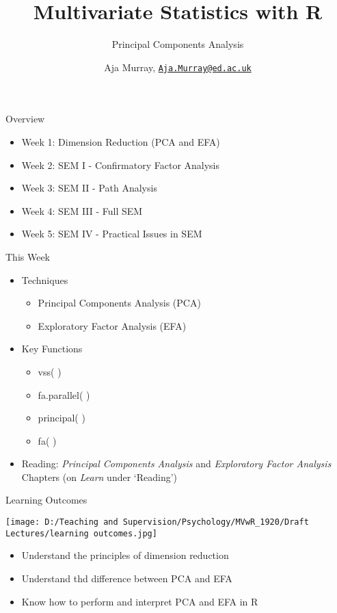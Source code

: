 \documentclass[
  ignorenonframetext,
]{beamer}
\title{Multivariate Statistics with R}
\subtitle{Principal Components Analysis}
\author{Aja Murray,
\href{mailto:Aja.Murray@ed.ac.uk}{\nolinkurl{Aja.Murray@ed.ac.uk}}}
\date{}
\providecommand{\tightlist}{%
  \setlength{\itemsep}{0pt}\setlength{\parskip}{0pt}}
\begin{document}
\frame{\titlepage}

\begin{frame}{Overview}
\protect\hypertarget{overview}{}

\begin{itemize}
\tightlist
\item
  Week 1: Dimension Reduction (PCA and EFA)
\item
  Week 2: SEM I - Confirmatory Factor Analysis
\item
  Week 3: SEM II - Path Analysis
\item
  Week 4: SEM III - Full SEM
\item
  Week 5: SEM IV - Practical Issues in SEM
\end{itemize}

\end{frame}

\begin{frame}{This Week}
\protect\hypertarget{this-week}{}

\begin{itemize}
\tightlist
\item
  Techniques

  \begin{itemize}
  \tightlist
  \item
    Principal Components Analysis (PCA)
  \item
    Exploratory Factor Analysis (EFA)
  \end{itemize}
\item
  Key Functions

  \begin{itemize}
  \tightlist
  \item
    vss( )
  \item
    fa.parallel( )
  \item
    principal( )
  \item
    fa( )
  \end{itemize}
\item
  Reading: \emph{Principal Components Analysis} and \emph{Exploratory
  Factor Analysis} Chapters (on \emph{Learn} under `Reading')
\end{itemize}

\end{frame}

\begin{frame}{Learning Outcomes}
\protect\hypertarget{learning-outcomes}{}

\texttt{[image: D:/Teaching and Supervision/Psychology/MVwR\_1920/Draft Lectures/learning outcomes.jpg]}

\begin{itemize}
\tightlist
\item
  Understand the principles of dimension reduction
\item
  Understand thd difference between PCA and EFA
\item
  Know how to perform and interpret PCA and EFA in R
\end{itemize}

\end{frame}
\end{document}

